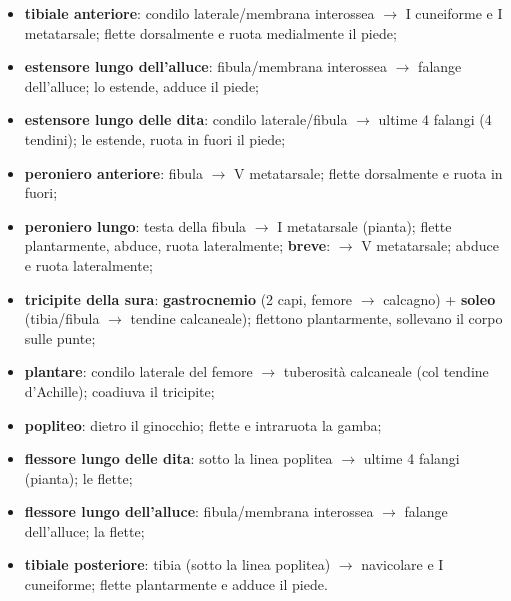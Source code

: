 \begin{itemize}
  \item \textbf{tibiale anteriore}: condilo laterale/membrana interossea $\rightarrow$ I cuneiforme e
    I metatarsale; flette dorsalmente e ruota medialmente il piede;
  \item \textbf{estensore lungo dell'alluce}: fibula/membrana interossea $\rightarrow$ falange
    dell'alluce; lo estende, adduce il piede;
  \item \textbf{estensore lungo delle dita}: condilo laterale/fibula $\rightarrow$ ultime 4 falangi
    (4 tendini); le estende, ruota in fuori il piede;
  \item \textbf{peroniero anteriore}: fibula $\rightarrow$ V metatarsale; flette dorsalmente e ruota
    in fuori;
  \item \textbf{peroniero lungo}: testa della fibula $\rightarrow$ I metatarsale (pianta); flette
    plantarmente, abduce, ruota lateralmente; \textbf{breve}: $\rightarrow$ V metatarsale; abduce e
    ruota lateralmente;
  \item \textbf{tricipite della sura}: \textbf{gastrocnemio} (2 capi, femore $\rightarrow$ calcagno)
    + \textbf{soleo} (tibia/fibula $\rightarrow$ tendine calcaneale); flettono plantarmente, sollevano
    il corpo sulle punte;
  \item \textbf{plantare}: condilo laterale del femore $\rightarrow$ tuberosità calcaneale (col tendine
    d'Achille); coadiuva il tricipite;
  \item \textbf{popliteo}: dietro il ginocchio; flette e intraruota la gamba;
  \item \textbf{flessore lungo delle dita}: sotto la linea poplitea $\rightarrow$ ultime 4 falangi
    (pianta); le flette;
  \item \textbf{flessore lungo dell'alluce}: fibula/membrana interossea $\rightarrow$ falange
    dell'alluce; la flette;
  \item \textbf{tibiale posteriore}: tibia (sotto la linea poplitea) $\rightarrow$ navicolare e I
    cuneiforme; flette plantarmente e adduce il piede.
\end{itemize}
